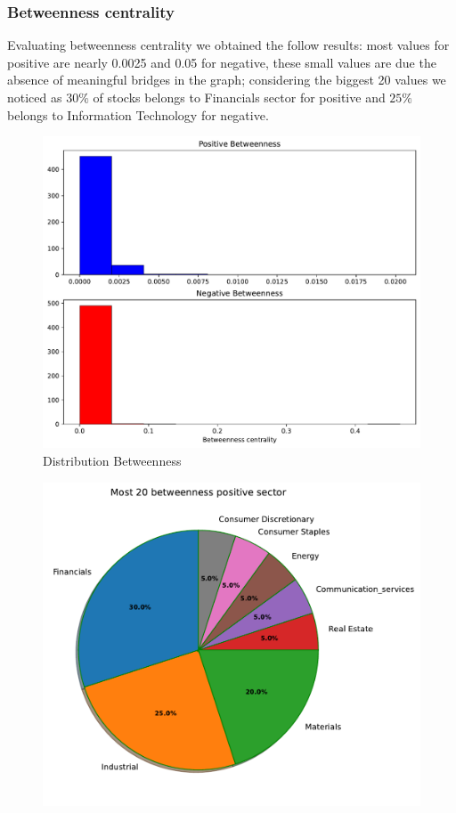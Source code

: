 \documentclass[sigchi]{acmart}
\begin{document}
\subsubsection{Betweenness centrality}
Evaluating betweenness centrality we obtained the follow results: most values for positive are nearly 0.0025 and 0.05 for negative, these small values are due the absence of meaningful bridges in the graph; considering the biggest 20 values we noticed as $30\%$ of stocks belongs to Financials sector for positive and $25\%$ belongs to Information Technology for negative.
\begin{figure}[h]
	\centering
	\includegraphics[width=\linewidth]{plot/distribution_betweenness.pdf}
	\caption{Distribution Betweenness}
\end{figure}
\begin{figure}[h]
	\centering
	\includegraphics[width=0.65\linewidth]{plot/pie_bet_pos.pdf}
\end{figure}
\end{document}
